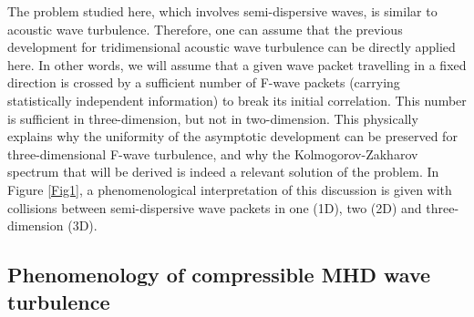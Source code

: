 \documentclass{jpp}
\begin{document}
The problem studied here, which involves semi-dispersive waves, is similar to acoustic wave turbulence. Therefore, one can assume that the previous development for tridimensional acoustic wave turbulence can be directly applied here. In other words, we will assume that a given wave packet travelling in a fixed direction is crossed by a sufficient number of F-wave packets (carrying statistically independent information) to break its initial correlation. This number is sufficient in three-dimension, but not in two-dimension. This physically explains why the uniformity of the asymptotic development can be preserved for three-dimensional F-wave turbulence, and why the Kolmogorov-Zakharov spectrum that will be derived is indeed a relevant solution of the problem. In Figure \ref{Fig1}, a phenomenological interpretation of this discussion is given with collisions between semi-dispersive wave packets in one (1D), two (2D) and three-dimension (3D). 


\subsection{Phenomenology of compressible MHD wave turbulence} \label{sec14}
\end{document}
